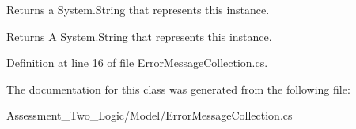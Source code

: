 Returns a System.String that represents this instance. 

\begin{DoxyReturn}{Returns}
A System.String that represents this instance. 
\end{DoxyReturn}


Definition at line 16 of file ErrorMessageCollection.cs.



The documentation for this class was generated from the following file:\begin{DoxyCompactItemize}
\item 
Assessment\_\-Two\_\-Logic/Model/ErrorMessageCollection.cs\end{DoxyCompactItemize}
